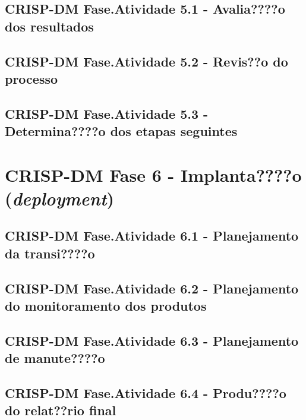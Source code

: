 \documentclass[]{article}
\begin{document}
\subsection{CRISP-DM Fase.Atividade 5.1 - Avalia????o dos
resultados}\label{crisp-dm-fase.atividade-5.1---avaliao-dos-resultados}

\subsection{CRISP-DM Fase.Atividade 5.2 - Revis??o do
processo}\label{crisp-dm-fase.atividade-5.2---reviso-do-processo}

\subsection{CRISP-DM Fase.Atividade 5.3 - Determina????o dos etapas
seguintes}\label{crisp-dm-fase.atividade-5.3---determinao-dos-etapas-seguintes}

\section{\texorpdfstring{CRISP-DM Fase 6 - \textbf{Implanta????o}
(\emph{deployment})}{CRISP-DM Fase 6 - Implanta????o (deployment)}}\label{crisp-dm-fase-6---implantao-deployment}

\subsection{CRISP-DM Fase.Atividade 6.1 - Planejamento da
transi????o}\label{crisp-dm-fase.atividade-6.1---planejamento-da-transio}

\subsection{CRISP-DM Fase.Atividade 6.2 - Planejamento do monitoramento
dos
produtos}\label{crisp-dm-fase.atividade-6.2---planejamento-do-monitoramento-dos-produtos}

\subsection{CRISP-DM Fase.Atividade 6.3 - Planejamento de
manute????o}\label{crisp-dm-fase.atividade-6.3---planejamento-de-manuteo}

\subsection{CRISP-DM Fase.Atividade 6.4 - Produ????o do relat??rio
final}\label{crisp-dm-fase.atividade-6.4---produo-do-relatrio-final}
\end{document}
